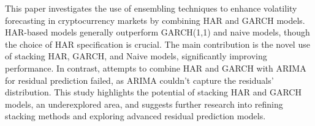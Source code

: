 This paper investigates the use of ensembling techniques to enhance volatility forecasting in cryptocurrency markets by combining HAR and GARCH models. HAR-based models generally outperform GARCH(1,1) and naive models, though the choice of HAR specification is crucial. The main contribution is the novel use of stacking HAR, GARCH, and Naive models, significantly improving performance. In contrast, attempts to combine HAR and GARCH with ARIMA for residual prediction failed, as ARIMA couldn't capture the residuals' distribution. This study highlights the potential of stacking HAR and GARCH models, an underexplored area, and suggests further research into refining stacking methods and exploring advanced residual prediction models.
